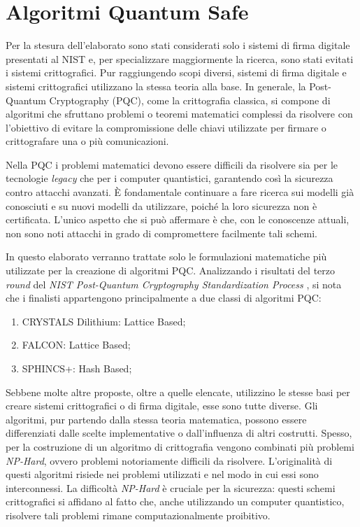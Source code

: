\chapter{Algoritmi Quantum Safe}

Per la stesura dell'elaborato sono stati considerati solo i sistemi di firma digitale presentati al NIST e, per specializzare maggiormente la ricerca, sono stati evitati i sistemi crittografici. Pur raggiungendo scopi diversi, sistemi di firma digitale e sistemi crittografici utilizzano la stessa teoria alla base. In generale, la Post-Quantum Cryptography (PQC), come la crittografia classica, si compone di algoritmi che sfruttano problemi o teoremi matematici complessi da risolvere con l’obiettivo di evitare la compromissione delle chiavi utilizzate per firmare o crittografare una o più comunicazioni. 

Nella PQC i problemi matematici devono essere difficili da risolvere sia per le tecnologie \textit{legacy} che per i computer quantistici, garantendo così la sicurezza contro attacchi avanzati. È fondamentale continuare a fare ricerca sui modelli già conosciuti e su nuovi modelli da utilizzare, poiché la loro sicurezza non è certificata. L'unico aspetto che si può affermare è che, con le conoscenze attuali, non sono noti attacchi in grado di compromettere facilmente tali schemi.

In questo elaborato verranno trattate solo le formulazioni matematiche più utilizzate per la creazione di algoritmi PQC. Analizzando i risultati del terzo \textit{round} del \textit{NIST Post-Quantum Cryptography Standardization Process} \cite{nist-pqc}, si nota che i finalisti appartengono principalmente a due classi di algoritmi PQC:
\begin{enumerate}
    \item CRYSTALS Dilithium: Lattice Based;
    \item FALCON: Lattice Based;
    \item SPHINCS+: Hash Based;
\end{enumerate}

Sebbene molte altre proposte, oltre a quelle elencate, utilizzino le stesse basi per creare sistemi crittografici o di firma digitale, esse sono tutte diverse. Gli algoritmi, pur partendo dalla stessa teoria matematica, possono essere differenziati dalle scelte implementative o dall'influenza di altri costrutti. Spesso, per la costruzione di un algoritmo di crittografia vengono combinati più problemi \textit{NP-Hard}, ovvero problemi notoriamente difficili da risolvere. L'originalità di questi algoritmi risiede nei problemi utilizzati e nel modo in cui essi sono interconnessi. La difficoltà \textit{NP-Hard} è cruciale per la sicurezza: questi schemi crittografici si affidano al fatto che, anche utilizzando un computer quantistico, risolvere tali problemi rimane computazionalmente proibitivo.

